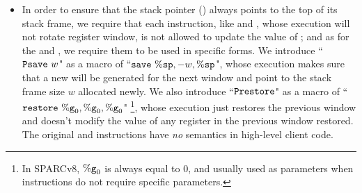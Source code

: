 \begin{itemize}
    \item
    In order to ensure that 
    the stack pointer (\spreg{}) always 
    points to the top of its stack frame, we require that   
    each instruction, like \cadd{} and \ld{}, whose 
    execution will not rotate register window, 
    is not allowed to update the value of \spreg{}; 
    and as for the \csave{} and \crestore{}, 
    we require them 
    to be used in specific forms. 
    We introduce ``$\Psave \ \word$" as a macro of 
    ``$\csave{} \ \spreg, -\word, \spreg$", 
    whose execution makes sure that a new \spreg{} 
    will be generated for the next window
    and point to the stack frame size $w$ allocated newly. 
    We also introduce ``$\texttt{Prestore}$" 
    as a macro of ``$\texttt{restore}{} \ \%\texttt{g}_{0}, \%\texttt{g}_{0}, \%\texttt{g}_{0}$"
    \footnote{In SPARCv8, $\%\texttt{g}_{0}$ is always equal to 0, 
    and usually used as parameters when instructions do not 
    require specific parameters.},  
    whose execution just restores the previous window 
    and doesn't modify the value of any register 
    in the previous window restored. 
    The original \csave{} and \crestore{} instructions 
    have \textit{no} semantics in high-level client code.   
    

\end{itemize}
